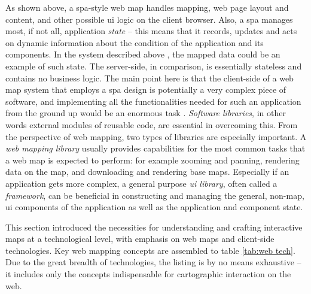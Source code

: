 As shown above, a \acrshort{spa}-style web map handles mapping,
web page layout and content, and other possible \acrshort{ui} logic
on the client browser.
Also, a \acrshort{spa} manages most, if not all,
application \textit{state} --
this means that it records, updates and acts on dynamic information about
the condition of the application and its components.
In the system described above ,
the mapped data could be an example of such state.
The server-side, in comparison,
is essentially stateless and contains no business logic.
The main point here is that the client-side of a
web map system that employs a \acrshort{spa} design
is potentially a very complex piece of software, and
implementing all the functionalities needed for such an application
from the ground up would be an enormous task \parencite{tai2021}.
\textit{Software libraries},
in other words external modules of reusable code,
are essential in overcoming this.
From the perspective of web mapping, two types of libraries are especially important.
A \textit{web mapping library} usually provides capabilities for the most common tasks
that a web map is expected to perform:
for example zooming and panning, rendering data on the map,
and downloading and rendering base maps.
Especially if an application gets more complex,
a general purpose \textit{\acrshort{ui} library},
often called a \textit{framework},
can be beneficial in constructing and managing
the general, non-map, \acrshort{ui} components of the application
as well as the application and component state.

This section introduced the necessities for
understanding and crafting interactive maps at a technological level,
with emphasis on web maps and client-side technologies.
Key web mapping concepts are assembled to table \ref{tab:web tech}.
Due to the great breadth of technologies,
the listing is by no means exhaustive --
it includes only the concepts indispensable for cartographic interaction on the web.
 




